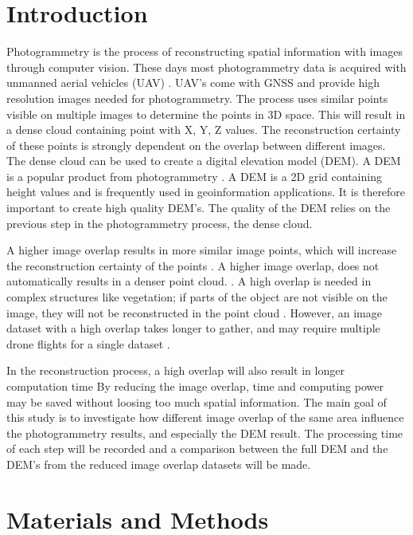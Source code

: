 \documentclass{isprs} %
\begin{document}
\section{Introduction}\label{Introduction}
Photogrammetry is the process of reconstructing spatial information with images through computer vision. 
These days most photogrammetry data is acquired with unmanned aerial vehicles (UAV) \citep{UAVAreMoreUsed}. 
UAV's come with GNSS and provide high resolution images needed for photogrammetry.
The process uses similar points visible on multiple images to determine the points in 3D space.
This will result in a dense cloud containing point with X, Y, Z values.
The reconstruction certainty of these points is strongly dependent on the overlap between different images.
The dense cloud can be used to create a digital elevation model (DEM).
A DEM is a popular product from photogrammetry \citep{DemIncrease1}.
A DEM is a 2D grid containing height values and is frequently used in geoinformation applications.
It is therefore important to create high quality DEM's.
The quality of the DEM relies on the previous step in the photogrammetry process, the dense cloud.

A higher image overlap results in more similar image points, which will increase the reconstruction certainty of the points \citep{MoreOverMoreAcc}.
A higher image overlap, does not automatically results in a denser point cloud. \citep{EffectofUABimgcamover}. 
A high overlap is needed in complex structures like vegetation; if parts of the object are not visible on the image, they will not be reconstructed in the point cloud \citep{AccessingImageOverlap}.
However, an image dataset with a high overlap takes longer to gather, and may require multiple drone flights for a single dataset \citep{rosnell2012point}.

In the reconstruction process, a high overlap will also result in longer computation time \citep{AccessingImageOverlap}
By reducing the image overlap, time and computing power may be saved without loosing too much spatial information.
The main goal of this study is to investigate how different image overlap of the same area influence the photogrammetry results, and especially the DEM result.
The processing time of each step will be recorded and a comparison between the full DEM and the DEM's from the reduced image overlap datasets will be made.

\section{Materials and Methods}
\end{document}
